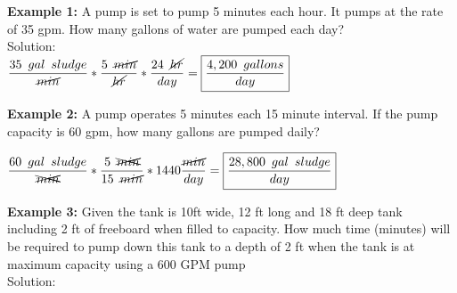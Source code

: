 \textbf{Example 1:}  A pump is set to pump 5 minutes each hour. It pumps at the rate of 35 gpm. How many gallons of water are pumped each day?\\
Solution:\\
$\dfrac{35 \enspace gal \enspace sludge}{\cancel{min}}*\dfrac{5 \enspace \cancel{min}}{\cancel{hr}} *\dfrac{24 \enspace \cancel{hr}}{day}=\boxed{\dfrac{4,200 \enspace gallons}{day}}$\\
\vspace{0.5cm}

\textbf{Example 2:}  A pump operates 5 minutes each 15 minute interval.  If the pump capacity is 60 gpm, how many gallons are pumped daily?

$\dfrac{60 \enspace gal \enspace sludge}{\xcancel{min}}*\dfrac{5 \enspace \xcancel{min}}{15 \enspace \cancel{min}}*1440\dfrac{\cancel{min}}{day}=\boxed{\dfrac {28,800 \enspace gal \enspace sludge }{day}}$\\
\vspace{0.5cm}

\textbf{Example 3:}  Given the tank is 10ft wide, 12 ft long and 18 ft deep tank including 2 ft of freeboard when filled to capacity. How much time (minutes) will be required to pump down this tank to a depth of 2 ft when the tank is at maximum capacity using a 600 GPM pump\\
Solution:\\
\vspace{0.5cm}


